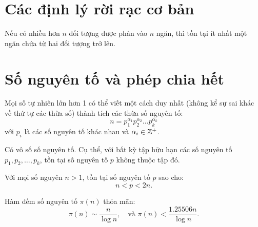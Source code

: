 \documentclass[../imo-training-open-book.tex]{subfiles}
\begin{document}
\section{Các định lý rời rạc cơ bản}

\begin{theorem*}\label{theorem:pigeonhole-principle}
	Nếu có nhiều hơn \( n \) đối tượng được phân vào \( n \) ngăn, thì tồn tại ít nhất một ngăn chứa từ hai đối tượng trở lên.
\end{theorem*}

\newpage

\section{Số nguyên tố và phép chia hết}

\begin{theorem*}
    \label{theorem:fundamental-theorem-of-arithmetic}
    Mọi số tự nhiên lớn hơn 1 có thể viết một cách duy nhất (không kể sự sai khác về thứ tự các thừa số) thành tích các thừa số nguyên tố:
    \[
        n = p_1^{\alpha_1} p_2^{\alpha_2} \dots p_k^{\alpha_k}
    \]
    với \( p_i \) là các số nguyên tố khác nhau và \( \alpha_i \in \mathbb Z^+ \).
\end{theorem*}

\vspace{1em}

\begin{theorem*}
    \label{theorem:infinitely-many-primes}
    Có vô số số nguyên tố. Cụ thể, với bất kỳ tập hữu hạn các số nguyên tố \( p_1, p_2, \dots, p_k \), tồn tại số nguyên tố \( p \) không thuộc tập đó.
\end{theorem*}

\vspace{1em}

\begin{theorem*}
    \label{theorem:bertrand-postulate}
    Với mọi số nguyên \( n > 1 \), tồn tại số nguyên tố \( p \) sao cho:
    \[
        n < p < 2n.
    \]
\end{theorem*}

\vspace{1em}

\begin{theorem*}
    \label{theorem:prime-number-theorem}
    Hàm đếm số nguyên tố \( \pi(n) \) thỏa mãn:
    \[
        \pi(n) \sim \frac{n}{\log n},\quad \text{và } \pi(n) < \frac{1.25506n}{\log n}.
    \]
\end{theorem*}
\end{document}
